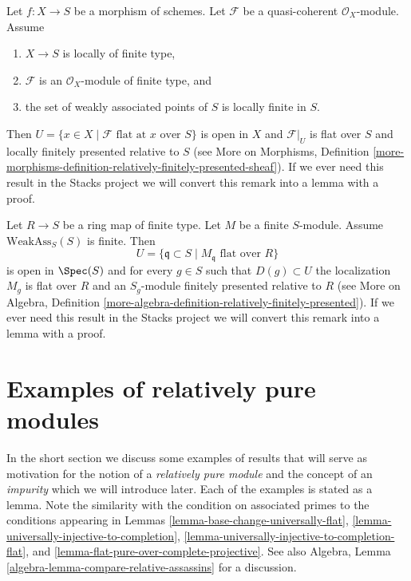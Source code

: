 \begin{remark}
\label{remark-finite-type-flat}
Let $f : X \to S$ be a morphism of schemes.
Let $\mathcal{F}$ be a quasi-coherent $\mathcal{O}_X$-module.
Assume
\begin{enumerate}
\item $X \to S$ is locally of finite type,
\item $\mathcal{F}$ is an $\mathcal{O}_X$-module of finite type, and
\item the set of weakly associated points of $S$ is locally finite in $S$.
\end{enumerate}
Then $U = \{x \in X \mid \mathcal{F}\text{ flat at }x\text{ over }S\}$
is open in $X$ and $\mathcal{F}|_U$ is flat over $S$ and locally
finitely presented relative to $S$ (see
More on Morphisms, Definition
\ref{more-morphisms-definition-relatively-finitely-presented-sheaf}).
If we ever need this result in the Stacks project we will convert
this remark into a lemma with a proof.
\end{remark}

\begin{remark}
\label{remark-finite-type-flat-algebra}
Let $R \to S$ be a ring map of finite type.
Let $M$ be a finite $S$-module.
Assume $\text{WeakAss}_S(S)$ is finite.
Then
$$
U = \{\mathfrak q \subset S \mid M_{\mathfrak q}\text{ flat over }R\}
$$
is open in $\Spec(S)$ and for every $g \in S$ such that
$D(g) \subset U$ the localization $M_g$ is flat over $R$ and
an $S_g$-module finitely presented relative to $R$ (see
More on Algebra, Definition
\ref{more-algebra-definition-relatively-finitely-presented}).
If we ever need this result in the Stacks project we will convert
this remark into a lemma with a proof.
\end{remark}









\section{Examples of relatively pure modules}
\label{section-examples-pure-modules}

\noindent
In the short section we discuss some examples of results that will serve
as motivation for the notion of a {\it relatively pure module} and the
concept of an {\it impurity} which we will introduce later. Each of the
examples is stated as a lemma. Note the similarity with the condition on
associated primes to the conditions appearing in
Lemmas \ref{lemma-base-change-universally-flat},
\ref{lemma-universally-injective-to-completion},
\ref{lemma-universally-injective-to-completion-flat}, and
\ref{lemma-flat-pure-over-complete-projective}.
See also
Algebra, Lemma \ref{algebra-lemma-compare-relative-assassins}
for a discussion.

